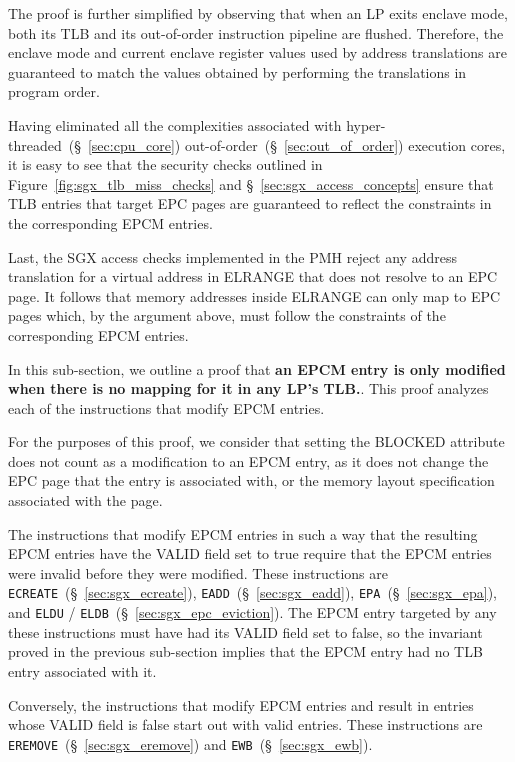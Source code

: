 The proof is further simplified by observing that when an LP exits enclave
mode, both its TLB and its out-of-order instruction pipeline are flushed.
Therefore, the enclave mode and current enclave register values used by address
translations are guaranteed to match the values obtained by performing the
translations in program order.

Having eliminated all the complexities associated with
hyper-threaded~(\S~\ref{sec:cpu_core}) out-of-order~(\S~\ref{sec:out_of_order})
execution cores, it is easy to see that the security checks outlined in
Figure~\ref{fig:sgx_tlb_miss_checks} and \S~\ref{sec:sgx_access_concepts}
ensure that TLB entries that target EPC pages are guaranteed to reflect the
constraints in the corresponding EPCM entries.

Last, the SGX access checks implemented in the PMH reject any address
translation for a virtual address in ELRANGE that does not resolve to an EPC
page. It follows that memory addresses inside ELRANGE can only map to EPC
pages which, by the argument above, must follow the constraints of the
corresponding EPCM entries.



In this sub-section, we outline a proof that \textbf{an EPCM entry is only
modified when there is no mapping for it in any LP's TLB.}. This proof analyzes
each of the instructions that modify EPCM entries.

For the purposes of this proof, we consider that setting the BLOCKED attribute
does not count as a modification to an EPCM entry, as it does not change the
EPC page that the entry is associated with, or the memory layout specification
associated with the page.

The instructions that modify EPCM entries in such a way that the resulting EPCM
entries have the VALID field set to true require that the EPCM entries were
invalid before they were modified. These instructions are
\texttt{ECREATE}~(\S~\ref{sec:sgx_ecreate}),
\texttt{EADD}~(\S~\ref{sec:sgx_eadd}), \texttt{EPA}~(\S~\ref{sec:sgx_epa}),
and \texttt{ELDU} / \texttt{ELDB}~(\S~\ref{sec:sgx_epc_eviction}). The EPCM
entry targeted by any these instructions must have had its VALID field set to
false, so the invariant proved in the previous sub-section implies that the
EPCM entry had no TLB entry associated with it.

Conversely, the instructions that modify EPCM entries and result in entries
whose VALID field is false start out with valid entries. These instructions are
\texttt{EREMOVE}~(\S~\ref{sec:sgx_eremove}) and
\texttt{EWB}~(\S~\ref{sec:sgx_ewb}).

